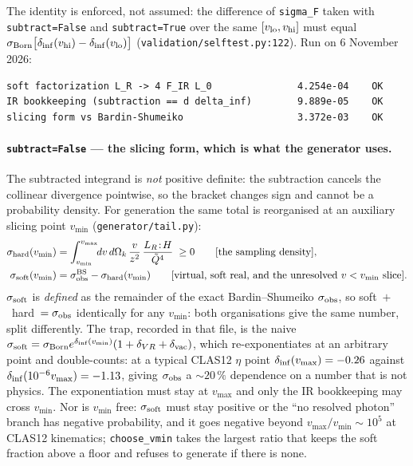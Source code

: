 \documentclass[11pt]{article}
\begin{document}
The identity is enforced, not assumed: the difference of \texttt{sigma\_F} taken with
\texttt{subtract=False} and \texttt{subtract=True} over the same $[v_{\rm lo},v_{\rm hi}]$ must
equal $\sigma_{\rm Born}\big[\delta_{\rm inf}(v_{\rm hi})-\delta_{\rm inf}(v_{\rm lo})\big]$
(\texttt{validation/selftest.py:122}). Run on 6 November 2026:
\begin{verbatim}
soft factorization L_R -> 4 F_IR L_0               4.254e-04    OK
IR bookkeeping (subtraction == d delta_inf)        9.889e-05    OK
slicing form vs Bardin-Shumeiko                    3.372e-03    OK
\end{verbatim}

\paragraph{\texttt{subtract=False} --- the slicing form, which is what the generator uses.} The
subtracted integrand is \emph{not} positive definite: the subtraction cancels the collinear
divergence pointwise, so the bracket changes sign and cannot be a probability density. For
generation the same total is reorganised at an auxiliary slicing point $v_{\min}$
(\texttt{generator/tail.py}):
\begin{align}
\sigma_{\rm hard}(v_{\min})&=\int_{v_{\min}}^{v_{\max}}\!\!dv\,d\Omega_k\,\frac{v}{z^2}\,
\frac{L_R\!:\!H}{\tilde Q^4}\;\ge 0 \qquad\text{[the sampling density]},\\
\sigma_{\rm soft}(v_{\min})&=\sigma_{\rm obs}^{\rm BS}-\sigma_{\rm hard}(v_{\min})
\qquad\text{[virtual, soft real, and the unresolved }v<v_{\min}\text{ slice]} .
\end{align}
$\sigma_{\rm soft}$ is \emph{defined} as the remainder of the exact Bardin--Shumeiko
$\sigma_{\rm obs}$, so soft~$+$~hard~$=\sigma_{\rm obs}$ identically for any $v_{\min}$: both
organisations give the same number, split differently. The trap, recorded in that file, is the naive
$\sigma_{\rm soft}=\sigma_{\rm Born}e^{\delta_{\rm inf}(v_{\min})}(1+\delta_{VR}+\delta_{\rm vac})$,
which re-exponentiates at an arbitrary point and double-counts: at a typical CLAS12 $\eta$ point
$\delta_{\rm inf}(v_{\max})=-0.26$ against $\delta_{\rm inf}(10^{-6}v_{\max})=-1.13$, giving
$\sigma_{\rm obs}$ a ${\sim}20\,\%$ dependence on a number that is not physics. The exponentiation
must stay at $v_{\max}$ and only the IR bookkeeping may cross $v_{\min}$. Nor is $v_{\min}$ free:
$\sigma_{\rm soft}$ must stay positive or the ``no resolved photon'' branch has negative
probability, and it goes negative beyond $v_{\max}/v_{\min}\sim10^5$ at CLAS12 kinematics;
\texttt{choose\_vmin} takes the largest ratio that keeps the soft fraction above a floor and refuses
to generate if there is none.
\end{document}
